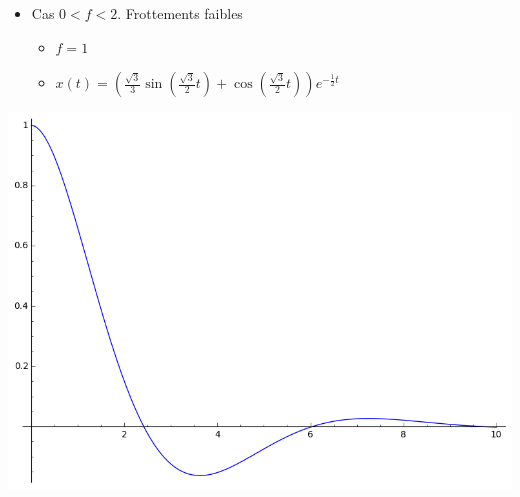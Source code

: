 \begin{frame}
\pause


\begin{minipage}{0.7\textwidth}
\begin{itemize}  
  \item Cas $0 < f < 2$. Frottements faibles
  
    \begin{itemize}
    \item $f=1$\pause
    \item $x(t)=\left(\frac{\sqrt{3}}{3} \sin\left(\frac{\sqrt{3}}{2} t\right) + 
   \cos\left(\frac{\sqrt{3}}{2} t\right)\right)
  e^{-\frac{1}{2} t}$
  \end{itemize}   
\end{itemize}
\end{minipage}\pause
\begin{minipage}{0.39\textwidth}
\includegraphics[scale=0.15]{figures/equadiff-ressort2.png}
\end{minipage}

\pause
\smallskip


\end{frame}
